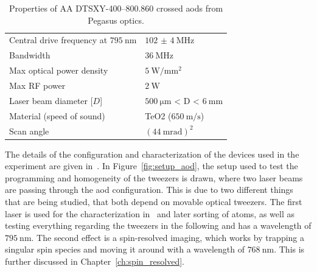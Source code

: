 \begin{table}[h]%
\label{tbl:pegasus_aod}
\centering
\begin{tabular}{l l}
	\toprule \toprule
	Central drive frequency at $\SI{795}{\nano\meter}$ & $\SI{102(4)}{\mega\hertz}$ \\
	Bandwidth & $\SI{36}{\mega\hertz}$ \\
	Max optical power density & $\SI{5}{\watt\per\milli\meter\squared}$ \\
	Max RF power & $\SI{2}{\watt}$ \\
	Laser beam diameter [$D$] & $\SI{500}{\micro\meter}$ < D < $\SI{6}{\milli\meter}$ \\
	Material (speed of sound) & TeO2 ($\SI{650}{\meter\per\second}$) \\
	Scan angle & ${(\SI{44}{\milli\radian})}^2$ \\
	\bottomrule \bottomrule
\end{tabular}
\caption{Properties of AA DTSXY-400--800.860 crossed \acp{aod} from Pegasus optics.}
\end{table}

\begin{figure}[ht]%
\label{fig:aod_pass}
\end{figure}

The details of the configuration and characterization of the devices used in the experiment are given in~\cite{Osterholz2020}.
In Figure~\ref{fig:setup_aod}, the setup used to test the programming and homogeneity of the tweezers is drawn, where two laser beams are passing through the \ac{aod} configuration. This is due to two different things that are being studied, that both depend on movable optical tweezers. The first laser is used for the characterization in~\cite{Osterholz2020} and later sorting of atoms, as well as testing everything regarding the tweezers in the following and has a wavelength of $\SI{795}{\nano\meter}$. The second effect is a spin-resolved imaging, which works by trapping a singular spin species and moving it around with a wavelength of $\SI{768}{\nano\meter}$. This is further discussed in Chapter~\ref{ch:spin_resolved}.

